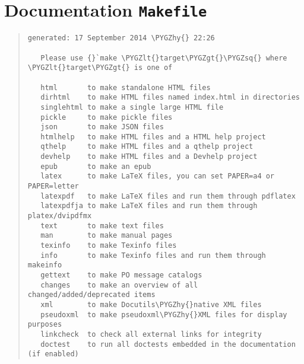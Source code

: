 \documentclass[letterpaper,10pt,english]{sphinxmanual}
\def\PYGZlt{\char`\<}
\def\PYGZgt{\char`\>}
\def\PYGZhy{\char`\-}
\def\PYGZsq{\char`\'}
\renewcommand\PYGZsq{\textquotesingle}
\begin{document}
\section{Documentation \texttt{Makefile}}
\label{docs_makefile::doc}\label{docs_makefile:documentation-makefile}\begin{quote}

\begin{Verbatim}[commandchars=\\\{\}]
generated: 17 September 2014 \PYGZhy{} 22:26

   Please use {}`make \PYGZlt{}target\PYGZgt{}\PYGZsq{} where \PYGZlt{}target\PYGZgt{} is one of

   html       to make standalone HTML files
   dirhtml    to make HTML files named index.html in directories
   singlehtml to make a single large HTML file
   pickle     to make pickle files
   json       to make JSON files
   htmlhelp   to make HTML files and a HTML help project
   qthelp     to make HTML files and a qthelp project
   devhelp    to make HTML files and a Devhelp project
   epub       to make an epub
   latex      to make LaTeX files, you can set PAPER=a4 or PAPER=letter
   latexpdf   to make LaTeX files and run them through pdflatex
   latexpdfja to make LaTeX files and run them through platex/dvipdfmx
   text       to make text files
   man        to make manual pages
   texinfo    to make Texinfo files
   info       to make Texinfo files and run them through makeinfo
   gettext    to make PO message catalogs
   changes    to make an overview of all changed/added/deprecated items
   xml        to make Docutils\PYGZhy{}native XML files
   pseudoxml  to make pseudoxml\PYGZhy{}XML files for display purposes
   linkcheck  to check all external links for integrity
   doctest    to run all doctests embedded in the documentation (if enabled)
\end{Verbatim}
\end{quote}
\end{document}
